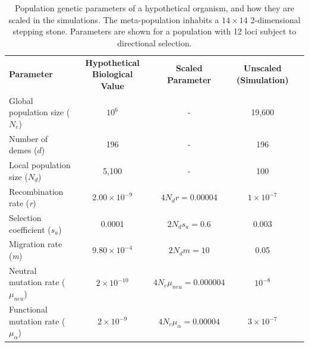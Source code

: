 \documentclass[10pt,twoside,lineno]{GSA_format}
\begin{document}
\begin{table}[H]
\label{tab:SimulationParameters}
\caption{Population genetic parameters of a hypothetical organism, and how they are scaled in the simulations. The meta-population inhabits a $14\times14$ 2-dimensional stepping stone. Parameters are shown for a population with 12 loci subject to directional selection.}
\begin{tabular}{lcccl}
\cline{1-4}
\textbf{Parameter} & \textbf{Hypothetical Biological Value} & \textbf{Scaled Parameter}        & \textbf{Unscaled (Simulation)} \\ \cline{1-4}
Global population size ($N_e$)                 & $10^6$                                      & -                           & 19,600                                              &           \\
Number of demes ($d$)                  & 196                                      & -                           & 196                                                &           \\
Local population size ($N_d$)                  & 5,100                                      & -                           & 100                                                &           \\
Recombination rate (\textit{r})                        & $2.00 \times 10^{-9}$ & $4N_dr = 0.00004$ & $1 \times 10^{-7}$                                           &\\
Selection coefficient (\textit{$s_{a}$})                        & 0.0001                                         & $2N_ds_{a}= 0.6$ & 0.003                                           &           \\
Migration rate (\textit{m})                        & $9.80\times 10^{-4}$                                      & $2N_dm = 10$        & 0.05                                               &           \\
Neutral mutation rate (\textit{$\mu_{neu}$})                        & $2\times 10^{-10}$                                      & $4N_e\mu_{neu} = 0.000004$        & $10^{-8}$ &           \\ 
Functional mutation rate (\textit{$\mu_\alpha$})                        & $2\times 10^{-9}$                                      & $4N_e\mu_\alpha = 0.00004$        & $3 \times 10^{-7}$ &           \\ \cline{1-4}
\end{tabular}

\end{table}
\end{document}
